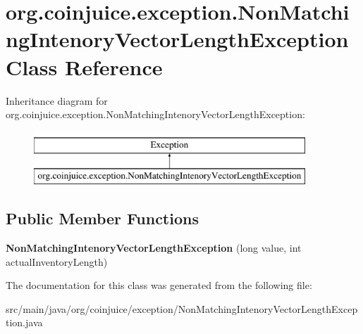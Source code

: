\hypertarget{classorg_1_1coinjuice_1_1exception_1_1_non_matching_intenory_vector_length_exception}{\section{org.\-coinjuice.\-exception.\-Non\-Matching\-Intenory\-Vector\-Length\-Exception Class Reference}
\label{classorg_1_1coinjuice_1_1exception_1_1_non_matching_intenory_vector_length_exception}
}
Inheritance diagram for org.\-coinjuice.\-exception.\-Non\-Matching\-Intenory\-Vector\-Length\-Exception\-:\begin{figure}[H]
\begin{center}
\leavevmode
\includegraphics[height=2.000000cm]{classorg_1_1coinjuice_1_1exception_1_1_non_matching_intenory_vector_length_exception}
\end{center}
\end{figure}
\subsection*{Public Member Functions}
\begin{DoxyCompactItemize}
\item 
\hypertarget{classorg_1_1coinjuice_1_1exception_1_1_non_matching_intenory_vector_length_exception_aaf4552c61c226c78331015209c935175}{{\bfseries Non\-Matching\-Intenory\-Vector\-Length\-Exception} (long value, int actual\-Inventory\-Length)}\label{classorg_1_1coinjuice_1_1exception_1_1_non_matching_intenory_vector_length_exception_aaf4552c61c226c78331015209c935175}

\end{DoxyCompactItemize}


The documentation for this class was generated from the following file\-:\begin{DoxyCompactItemize}
\item 
src/main/java/org/coinjuice/exception/Non\-Matching\-Intenory\-Vector\-Length\-Exception.\-java\end{DoxyCompactItemize}
